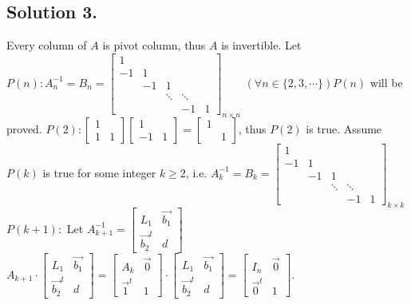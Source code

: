 \documentclass{article}
\begin{document}
\subsection*{Solution 3.}
Every column of $A$ is pivot column, thus $A$ is invertible.\newline
Let $P(n): A_n^{-1} =B_n= \left[\begin{array}{rrrrr}1\\-1&1\\&-1&1\\&&\ddots&\ddots\\&&&-1&1\end{array}\right]_{n\times n}$\newline
$(\forall n\in \{2,3,\cdots\})P(n)$ will be proved.\newline
$P(2):\left[\begin{array}{rr}1\\1&1\end{array}\right]\left[\begin{array}{rr}1\\-1&1\end{array}\right]=\left[\begin{array}{rr}1\\&1\end{array}\right]$, thus $P(2)$ is true.\newline
Assume $P(k)$ is true for some integer $k\geq 2$, i.e. $A_k^{-1} =B_k= \left[\begin{array}{rrrrr}1\\-1&1\\&-1&1\\&&\ddots&\ddots\\&&&-1&1\end{array}\right]_{k\times k}$\newline
$P(k+1):$\newline
Let $A_{k+1}^{-1}=\left[\begin{array}{rr}L_1&\Vec{b_1}\\\Vec{b_2}^t&d\end{array}\right]$\newline
$A_{k+1}\cdot\left[\begin{array}{rr}L_1&\Vec{b_1}\\\Vec{b_2}^t&d\end{array}\right]=\left[\begin{array}{rr}A_k&\Vec{0}\\\Vec{1}^t&1\end{array}\right]\cdot\left[\begin{array}{rr}L_1&\Vec{b_1}\\\Vec{b_2}^t&d\end{array}\right]=\left[\begin{array}{rr}I_n&\Vec{0}\\\Vec{0}^t&1\end{array}\right]$.
\end{document}
